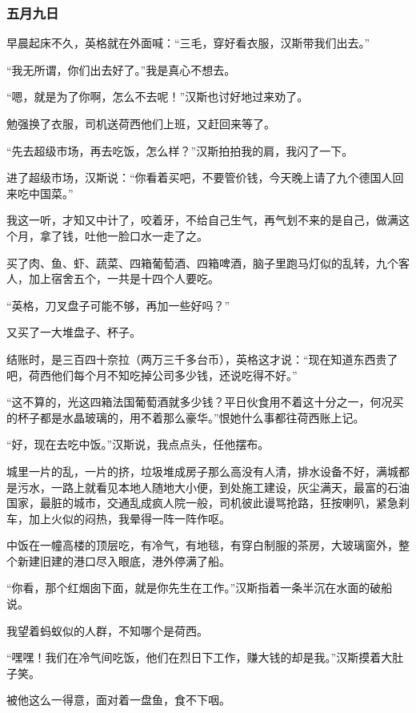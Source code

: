 \subsubsection{五月九日}
\par 早晨起床不久，英格就在外面喊：“三毛，穿好看衣服，汉斯带我们出去。”
\par “我无所谓，你们出去好了。”我是真心不想去。
\par “嗯，就是为了你啊，怎么不去呢！”汉斯也讨好地过来劝了。
\par 勉强换了衣服，司机送荷西他们上班，又赶回来等了。
\par “先去超级市场，再去吃饭，怎么样？”汉斯拍拍我的肩，我闪了一下。
\par 进了超级市场，汉斯说：“你看着买吧，不要管价钱，今天晚上请了九个德国人回来吃中国菜。”
\par 我这一听，才知又中计了，咬着牙，不给自己生气，再气划不来的是自己，做满这个月，拿了钱，吐他一脸口水一走了之。
\par 买了肉、鱼、虾、蔬菜、四箱葡萄酒、四箱啤酒，脑子里跑马灯似的乱转，九个客人，加上宿舍五个，一共是十四个人要吃。
\par “英格，刀叉盘子可能不够，再加一些好吗？”
\par 又买了一大堆盘子、杯子。
\par 结账时，是三百四十奈拉（两万三千多台币），英格这才说：“现在知道东西贵了吧，荷西他们每个月不知吃掉公司多少钱，还说吃得不好。”
\par “这不算的，光这四箱法国葡萄酒就多少钱？平日伙食用不着这十分之一，何况买的杯子都是水晶玻璃的，用不着那么豪华。”恨她什么事都往荷西账上记。
\par “好，现在去吃中饭。”汉斯说，我点点头，任他摆布。
\par 城里一片的乱，一片的挤，垃圾堆成房子那么高没有人清，排水设备不好，满城都是污水，一路上就看见本地人随地大小便，到处施工建设，灰尘满天，最富的石油国家，最脏的城市，交通乱成疯人院一般，司机彼此谩骂抢路，狂按喇叭，紧急刹车，加上火似的闷热，我晕得一阵一阵作呕。
\par 中饭在一幢高楼的顶层吃，有冷气，有地毯，有穿白制服的茶房，大玻璃窗外，整个新建旧建的港口尽入眼底，港外停满了船。
\par “你看，那个红烟囱下面，就是你先生在工作。”汉斯指着一条半沉在水面的破船说。
\par 我望着蚂蚁似的人群，不知哪个是荷西。
\par “嘿嘿！我们在冷气间吃饭，他们在烈日下工作，赚大钱的却是我。”汉斯摸着大肚子笑。
\par 被他这么一得意，面对着一盘鱼，食不下咽。
